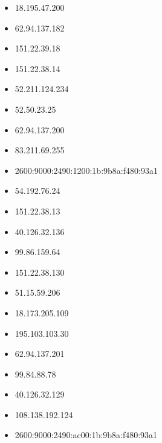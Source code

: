 \documentclass{article}
\begin{document}
\begin{itemize}
            \item 18.195.47.200
        
            \item 62.94.137.182
        
            \item 151.22.39.18
        
            \item 151.22.38.14
        
            \item 52.211.124.234
        
            \item 52.50.23.25
        
            \item 62.94.137.200
        
            \item 83.211.69.255
        
            \item 2600:9000:2490:1200:1b:9b8a:f480:93a1
        
            \item 54.192.76.24
        
            \item 151.22.38.13
        
            \item 40.126.32.136
        
            \item 99.86.159.64
        
            \item 151.22.38.130
        
            \item 51.15.59.206
        
            \item 18.173.205.109
        
            \item 195.103.103.30
        
            \item 62.94.137.201
        
            \item 99.84.88.78
        
            \item 40.126.32.129
        
            \item 108.138.192.124
        
            \item 2600:9000:2490:ac00:1b:9b8a:f480:93a1
        

\end{itemize}
\end{document}
